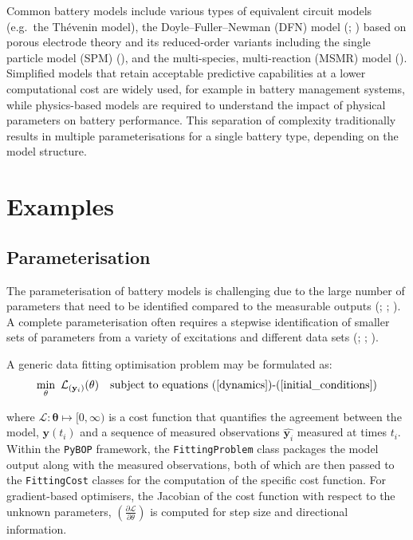 \documentclass[
]{article}
\begin{document}
Common battery models include various types of equivalent circuit models
(e.g.~the Thévenin model), the Doyle--Fuller--Newman (DFN) model
(;
) based on porous
electrode theory and its reduced-order variants including the single
particle model (SPM) (), and the multi-species, multi-reaction (MSMR) model
(). Simplified
models that retain acceptable predictive capabilities at a lower
computational cost are widely used, for example in battery management
systems, while physics-based models are required to understand the
impact of physical parameters on battery performance. This separation of
complexity traditionally results in multiple parameterisations for a
single battery type, depending on the model structure.

\section{Examples}\label{examples}

\subsection{Parameterisation}\label{parameterisation}

The parameterisation of battery models is challenging due to the large
number of parameters that need to be identified compared to the
measurable outputs (; ;
). A complete
parameterisation often requires a stepwise identification of smaller
sets of parameters from a variety of excitations and different data sets
(;
; ).

A generic data fitting optimisation problem may be formulated as:
\begin{equation}
\min_{\mathbf{\theta}} ~ \mathcal{L}_{(\mathbf{y}_i)}(\mathbf{\theta}) ~~~
\textrm{subject to equations (\ref{dynamics})\textrm{-}(\ref{initial_conditions})}
\label{eqn:parameterisation}
\end{equation}

where \(\mathcal{L} : \mathbf{\theta} \mapsto [0,\infty)\) is a cost
function that quantifies the agreement between the model,
\(\mathbf{y}(t_i)\) and a sequence of measured observations
\(\hat{\mathbf{y}_i}\) measured at times \(t_i\). Within the
\texttt{PyBOP} framework, the \texttt{FittingProblem} class packages the
model output along with the measured observations, both of which are
then passed to the \texttt{FittingCost} classes for the computation of
the specific cost function. For gradient-based optimisers, the Jacobian
of the cost function with respect to the unknown parameters,
\((\frac{\partial \mathcal{L}}{\partial \theta})\) is computed for step
size and directional information.
\end{document}
